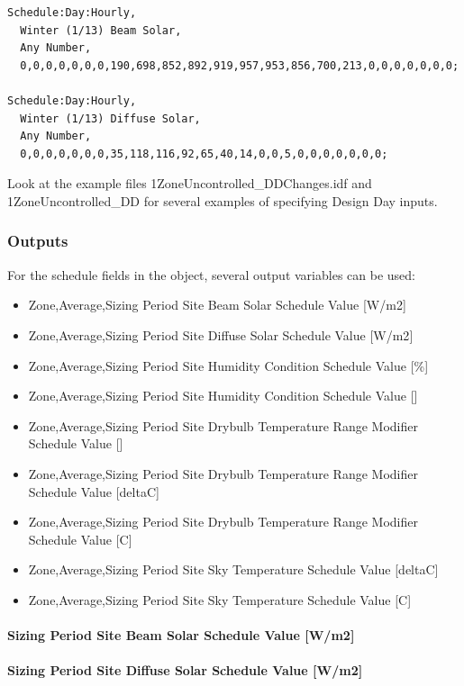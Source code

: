 \begin{lstlisting}
Schedule:Day:Hourly,
  Winter (1/13) Beam Solar,
  Any Number,
  0,0,0,0,0,0,0,190,698,852,892,919,957,953,856,700,213,0,0,0,0,0,0,0;

Schedule:Day:Hourly,
  Winter (1/13) Diffuse Solar,
  Any Number,
  0,0,0,0,0,0,0,35,118,116,92,65,40,14,0,0,5,0,0,0,0,0,0,0;
\end{lstlisting}

Look at the example files 1Zone\-Un\-controll\-ed\_\-DD\-Changes.idf and 1Zone\-Un\-controlled\_\-DD for several examples of specifying Design Day inputs.

\subsubsection{Outputs}\label{outputs-018}

For the schedule fields in the object, several output variables can be used:

\begin{itemize}
\item
  Zone,Average,Sizing Period Site Beam Solar Schedule Value {[}W/m2{]}
\item
  Zone,Average,Sizing Period Site Diffuse Solar Schedule Value {[}W/m2{]}
\item
  Zone,Average,Sizing Period Site Humidity Condition Schedule Value {[}\%{]}
\item
  Zone,Average,Sizing Period Site Humidity Condition Schedule Value {[]}
\item
  Zone,Average,Sizing Period Site Drybulb Temperature Range Modifier Schedule Value {[]}
\item
  Zone,Average,Sizing Period Site Drybulb Temperature Range Modifier Schedule Value {[}deltaC{]}
\item
  Zone,Average,Sizing Period Site Drybulb Temperature Range Modifier Schedule Value {[}C{]}
\item
  Zone,Average,Sizing Period Site Sky Temperature Schedule Value {[}deltaC{]}
\item
  Zone,Average,Sizing Period Site Sky Temperature Schedule Value {[}C{]}
\end{itemize}

\paragraph{Sizing Period Site Beam Solar Schedule Value {[}W/m2{]}}\label{sizing-period-site-beam-solar-schedule-value-wm2}

\paragraph{Sizing Period Site Diffuse Solar Schedule Value {[}W/m2{]}}\label{sizing-period-site-diffuse-solar-schedule-value-wm2}

